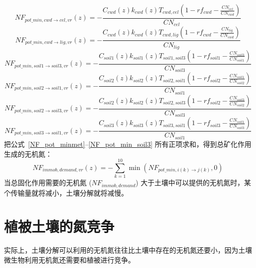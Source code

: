 \begin{equation}
    NF_{pot\_{min,cwd \rightarrow {cel,vr}}}(z)=-\frac{C_{cwd}\left(z\right)k_{cwd}\left(z\right)T_{cwd,cel}\left(1-rf_{cwd}-\frac{CN_{cel}}{CN_{cwd}}\right)}{CN_{cel}}
\end{equation}
\begin{equation}
    NF_{pot\_{min,cwd \rightarrow {lig,vr}}}(z)=-\frac{C_{cwd}\left(z\right)k_{cwd}\left(z\right)T_{cwd,lig}\left(1-rf_{cwd}-\frac{CN_{lig}}{CN_{cwd}}\right)}{CN_{lig}}
\end{equation}
\begin{equation}
    NF_{pot\_{min,soil1\rightarrow {soil3,vr}}}(z)=-\frac{C_{soil1}\left(z\right)k_{soil1}\left(z\right)T_{soil1,soil3}\left(1-rf_{soil1}-\frac{CN_{soil3}}{CN_{soil1}}\right)}{CN_{soil3}}
\end{equation}
\begin{equation}
    NF_{pot\_{min,soil2 \rightarrow {soil1,vr}}}(z)=-\frac{C_{soil2}\left(z\right)k_{soil2}\left(z\right)T_{soil2,soil1}\left(1-rf_{soil2}-\frac{CN_{soil1}}{CN_{soil2}}\right)}{CN_{soil1}}
\end{equation}
\begin{equation}
    NF_{pot\_{min,soil2 \rightarrow {soil3,vr}}}(z)=-\frac{C_{soil2}\left(z\right)k_{soil2}\left(z\right)T_{soil2,soil3}\left(1-rf_{soil2}-\frac{CN_{soil3}}{CN_{soil2}}\right)}{CN_{soil3}}
\end{equation}
\begin{equation}\label{NF_pot_min_soil3}
    NF_{pot\_{min,soil3 \rightarrow {soil1,vr}}}(z)=-\frac{C_{soil3}\left(z\right)k_{soil3}\left(z\right)T_{soil3,soil1}\left(1-rf_{soil3}-\frac{CN_{soil1}}{CN_{soil3}}\right)}{CN_{soil1}}
\end{equation}
把公式~\eqref{NF_pot_minmet}--\eqref{NF_pot_min_soil3} 所有正项求和，得到总矿化作用生成的无机氮：
\begin{equation}\label{NF_immob_demand_vr}
    NF_{immob,demand,vr}(z)=-\sum_{k=1}^{10}\min{\left(NF_{pot\_min,i(k)\rightarrow j (k)}, 0\right)}
\end{equation}
当总固化作用需要的无机氮 ($NF_{immob,demand}$) 大于土壤中可以提供的无机氮时，某个传输量就将减小，土壤分解就将减慢。


\section{植被土壤的氮竞争}\label{植被土壤的氮竞争}
实际上，土壤分解可以利用的无机氮往往比土壤中存在的无机氮还要小，因为土壤微生物利用无机氮还需要和植被进行竞争。

